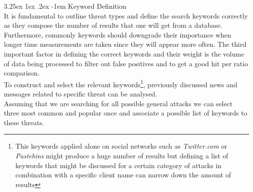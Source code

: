 \documentclass[12pt]{article}
\makeatletter
\renewcommand\paragraph{\@startsection{paragraph}{5}{\z@}%
  {3.25ex \@plus1ex \@minus.2ex}%
  {-1em}%
  {\normalfont\normalsize\bfseries}}
\makeatother
\begin{document}
\paragraph{Keyword Definition}
\hfill \break \\
It is fundamental to outline threat types and define the search keywords correctly as they compose the number of results that one will get from a database. Furthermore, commonly keywords should downgrade their importance when longer time measurements are taken since they will appear more often. The third important factor in defining the correct keywords and their weight is the volume of data being processed to filter out false positives and to get a good hit per ratio comparison. 
\hfill \break \\
To construct and select the relevant keywords\footnote{This keywords applied alone on social networks such as \textit{Twitter.com} or \textit{Pastebins} might produce a huge number of results but defining a list of keywords that might be discussed for a certain category of attacks in combination with a specific client name can narrow down the amount of results }, previously discussed news \cite{list-2015-attacks} and messages related to specific threat can be analysed.
\hfill \break \\
Assuming that we are searching for all possible general attacks we can select three most common and popular once \cite{owasp} and associate a possible list of keywords to these threats. 
\end{document}
